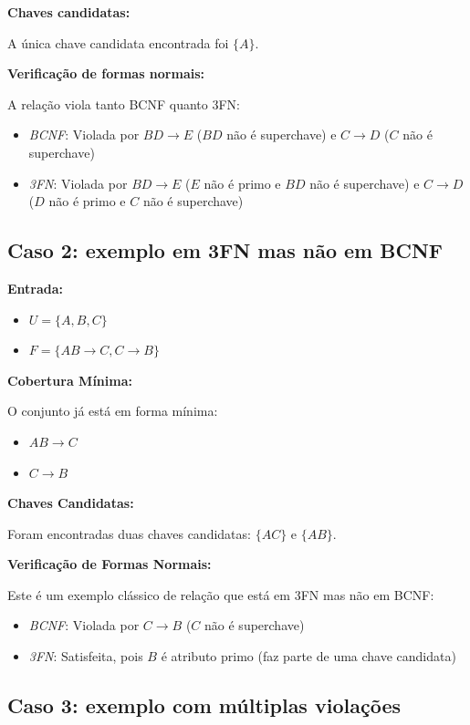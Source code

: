 \documentclass{article}
\begin{document}
\textbf{Chaves candidatas:}

A única chave candidata encontrada foi $ \{A\} $.

\textbf{Verificação de formas normais:}

A relação viola tanto BCNF quanto 3FN:
\begin{itemize}
    \item \textit{BCNF}: Violada por $ BD \rightarrow E $ ($ BD $ não é superchave) e $ C \rightarrow D $ ($ C $ não é superchave)
    \item \textit{3FN}: Violada por $ BD \rightarrow E $ ($ E $ não é primo e $ BD $ não é superchave) e $ C \rightarrow D $ ($ D $ não é primo e $ C $ não é superchave)
\end{itemize}

\subsection{Caso 2: exemplo em 3FN mas não em BCNF}

\textbf{Entrada:}
\begin{itemize}
    \item $ U = \{A, B, C\} $
    \item $ F = \{AB \rightarrow C, C \rightarrow B\} $
\end{itemize}

\textbf{Cobertura Mínima:}

O conjunto já está em forma mínima:
\begin{itemize}
    \item $ AB \rightarrow C $
    \item $ C \rightarrow B $
\end{itemize}

\textbf{Chaves Candidatas:}

Foram encontradas duas chaves candidatas: $ \{AC\} $ e $ \{AB\} $.

\textbf{Verificação de Formas Normais:}

Este é um exemplo clássico de relação que está em 3FN mas não em BCNF:
\begin{itemize}
    \item \textit{BCNF}: Violada por $ C \rightarrow B $ ($ C $ não é superchave)
    \item \textit{3FN}: Satisfeita, pois $ B $ é atributo primo (faz parte de uma chave candidata)
\end{itemize}

\subsection{Caso 3: exemplo com múltiplas violações}
\end{document}

